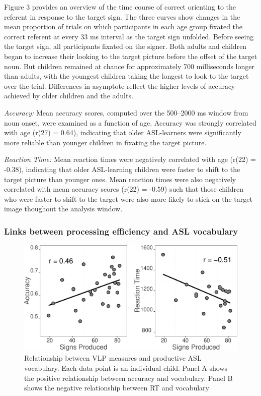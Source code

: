 \documentclass[12pt,]{article}
\begin{document}
Figure 3 provides an overview of the time course of correct orienting to
the referent in response to the target sign. The three curves show
changes in the mean proportion of trials on which participants in each
age group fixated the correct referent at every 33 ms interval as the
target sign unfolded. Before seeing the target sign, all participants
fixated on the signer. Both adults and children began to increase their
looking to the target picture before the offset of the target noun. But
children remained at chance for approximately 700 milliseconds longer
than adults, with the youngest children taking the longest to look to
the target over the trial. Differences in asymptote reflect the higher
levels of accuracy achieved by older children and the adults.

\emph{Accuracy:} Mean accuracy scores, computed over the 500--2000 ms
window from noun onset, were examined as a function of age. Accuracy was
strongly correlated with age (r(27) = 0.64), indicating that older
ASL-learners were significantly more reliable than younger children in
fixating the target picture.

\emph{Reaction Time:} Mean reaction times were negatively correlated
with age (r(22) = -0.38), indicating that older ASL-learning children
were faster to shift to the target picture than younger ones. Mean
reaction times were also negatively correlated with mean accuracy scores
(r(22) = -0.59) such that those children who were faster to shift to the
target were also more likely to stick on the target image thoughout the
analysis window.

\subsubsection{Links between processing efficiency and ASL
vocabulary}\label{links-between-processing-efficiency-and-asl-vocabulary}

\begin{figure}[htbp]
\centering
\includegraphics{Figs/vocab scatter plots-1.pdf}
\caption{Relationship between VLP measures and productive ASL
vocabulary. Each data point is an individual child. Panel A shows the
positive relationship between accuracy and vocabulary. Panel B shows the
negative relationship between RT and vocabulary}
\end{figure}
\end{document}
